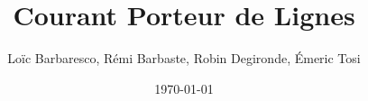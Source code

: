 \documentclass[a4paper,11pt]{article}
\title{Courant Porteur de Lignes}
\author{Loïc Barbaresco, Rémi Barbaste, Robin Degironde, Émeric Tosi}
\date{\today}
\begin{document}
    \maketitle{}
    \clearpage


    \setcounter{tocdepth}{2} %
    \renewcommand{\contentsname}{Sommaire} %
    \tableofcontents{} %
    \clearpage


    
    \clearpage

    
    \clearpage

    \listoffigures
    \clearpage
\end{document}
